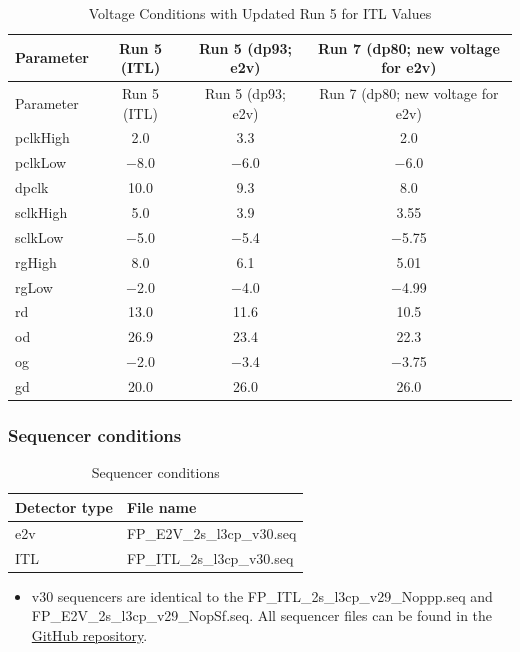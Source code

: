 \begin{longtable}{@{}l|c|cc@{}}
\caption{Voltage Conditions with Updated Run 5 for ITL Values} \\
\toprule
Parameter & Run 5 (ITL) & Run 5 (dp93; e2v) & Run 7 (dp80; new voltage for e2v) \\
\midrule
\endfirsthead
\toprule
Parameter & Run 5 (ITL) & Run 5 (dp93; e2v) & Run 7 (dp80; new voltage for e2v) \\
\midrule
\endhead
\bottomrule
\endfoot
pclkHigh & 2.0 & 3.3 & 2.0 \\
pclkLow & $-$8.0 & $-$6.0 & $-$6.0 \\
dpclk & 10.0 & 9.3 & 8.0 \\
sclkHigh & 5.0 & 3.9 & 3.55 \\
sclkLow & $-$5.0 & $-$5.4 & $-$5.75 \\
rgHigh & 8.0 & 6.1 & 5.01 \\
rgLow & $-$2.0 & $-$4.0 & $-$4.99 \\
rd & 13.0 & 11.6 & 10.5 \\
od & 26.9 & 23.4 & 22.3 \\
og & $-$2.0 & $-$3.4 & $-$3.75 \\
gd & 20.0 & 26.0 & 26.0 \\
\end{longtable}



\subsubsection{Sequencer conditions}\label{sequencer-conditions}

\begin{table}[h!]
\centering
\caption{Sequencer conditions}
\begin{tabular}{ll}
\toprule
Detector type & File name \\
\midrule
e2v & FP\_E2V\_2s\_l3cp\_v30.seq \\
ITL & FP\_ITL\_2s\_l3cp\_v30.seq \\
\bottomrule
\end{tabular}
\end{table}


\begin{itemize}
\tightlist
\item
  v30 sequencers are identical to the
  FP\_ITL\_2s\_l3cp\_v29\_Noppp.seq
  and
  FP\_E2V\_2s\_l3cp\_v29\_NopSf.seq.
  All sequencer files can be found in the \href{https://github.com/lsst-camera-dh/sequencer-files/tree/master/run7}{GitHub
  repository}.
\end{itemize}

